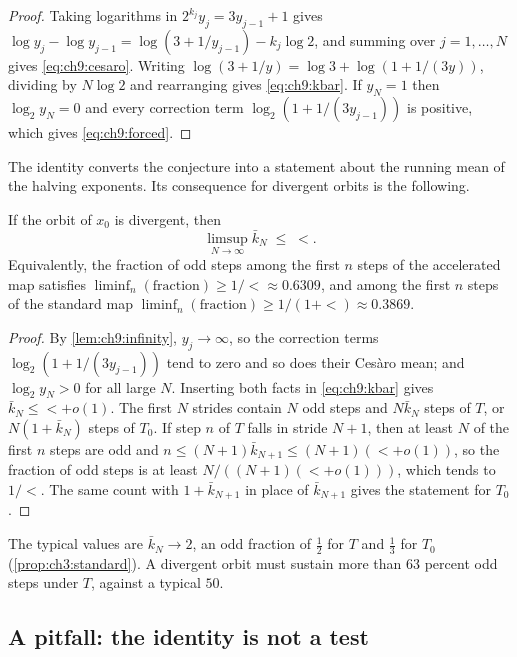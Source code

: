 \begin{proof}
Taking logarithms in $2^{k_j}y_j=3y_{j-1}+1$ gives
$\log y_j-\log y_{j-1}=\log(3+1/y_{j-1})-k_j\log2$, and summing over
$j=1,\ldots,N$ gives \eqref{eq:ch9:cesaro}. Writing
$\log(3+1/y)=\log3+\log(1+1/(3y))$, dividing by $N\log2$ and rearranging
gives \eqref{eq:ch9:kbar}. If $y_N=1$ then $\log_2y_N=0$ and every correction
term $\log_2(1+1/(3y_{j-1}))$ is positive, which gives \eqref{eq:ch9:forced}.
\end{proof}

The identity converts the conjecture into a statement about the running mean
of the halving exponents. Its consequence for divergent orbits is the
following.

\begin{corollary}\label{cor:ch9:freq}
If the orbit of $x_0$ is divergent, then
\[
  \limsup_{N\to\infty}\bar k_N\;\le\;\lt .
\]
Equivalently, the fraction of odd steps among the first $n$ steps of the
accelerated map satisfies $\liminf_n(\text{fraction})\geq1/\lt\approx0.6309$,
and among the first $n$ steps of the standard map
$\liminf_n(\text{fraction})\geq1/(1+\lt)\approx0.3869$.
\end{corollary}

\begin{proof}
By \cref{lem:ch9:infinity}, $y_j\to\infty$, so the correction terms
$\log_2(1+1/(3y_{j-1}))$ tend to zero and so does their Ces\`aro mean; and
$\log_2y_N>0$ for all large $N$. Inserting both facts in \eqref{eq:ch9:kbar}
gives $\bar k_N\le\lt+o(1)$. The first $N$ strides contain $N$ odd steps and
$N\bar k_N$ steps of $T$, or $N(1+\bar k_N)$ steps of $T_0$. If step $n$ of
$T$ falls in stride $N+1$, then at least $N$ of the first $n$ steps are odd and
$n\le(N+1)\bar k_{N+1}\le(N+1)(\lt+o(1))$, so the fraction of odd steps is at
least $N/((N+1)(\lt+o(1)))$, which tends to $1/\lt$. The same count with
$1+\bar k_{N+1}$ in place of $\bar k_{N+1}$ gives the statement for $T_0$.
\end{proof}

The typical values are $\bar k_N\to2$, an odd fraction of $\tfrac12$ for $T$
and $\tfrac13$ for $T_0$ (\cref{prop:ch3:standard}). A divergent orbit must
sustain more than $63$ percent odd steps under $T$, against a typical $50$.

\subsection{A pitfall: the identity is not a test}

